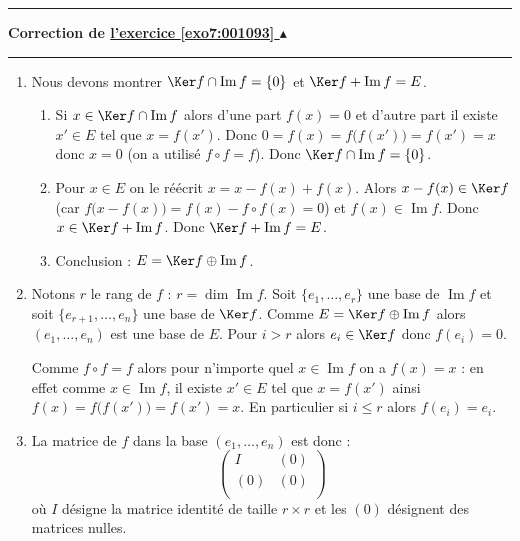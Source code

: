 \documentclass[11pt,a4paper]{article}
\renewcommand{\Im}{\mathop{\mathrm{Im}}\nolimits}
\renewcommand{\le}{\leqslant} \renewcommand{\leq}{\leqslant}
\newcounter{exo}
\newcommand{\correction}[1]{\hypertarget{cor7:#1}{}\label{cor7:#1}{\bf Correction de \hyperlink{exo7:#1}{l'exercice \ref{exo7:#1} $\blacktriangle$}}\vspace{1mm}\hrule\vspace{1mm}}
\newcommand{\fincorrection}{\vspace{1mm}\hrule\vspace*{7mm}}
\begin{document}
\fincorrection
\correction{001093}
\begin{enumerate}
  \item Nous devons montrer $\Ker f \cap \Im f = \{0\}$ et 
$\Ker f + \Im f = E$.
  \begin{enumerate}
     \item Si $x \in \Ker f \cap \Im f$ alors d'une part $f(x)=0$ et d'autre part il existe $x'\in E$ tel que 
$x=f(x')$. Donc $0=f(x)=f\big(f(x')\big)= f(x')=x$ donc $x=0$ (on a utilisé $f\circ f=f$). 
Donc $\Ker f \cap \Im f = \{0\}$.

     \item Pour $x\in E$ on le réécrit $x=x-f(x) + f(x)$. Alors $x-f(x) \in \Ker f$ 
(car $f\big(x-f(x) \big)=f(x)-f\circ f (x)=0$)
et $f(x)\in \Im f$. Donc $x \in \Ker f + \Im f$. Donc $\Ker f + \Im f = E$.

     \item Conclusion  : $E= \Ker f \oplus \Im f$.
  \end{enumerate}

  \item Notons $r$ le rang de $f$ : $r=\dim \Im f$.
Soit $\{e_1,\ldots,e_r\}$ une base de $\Im f$ et 
soit $\{e_{r+1},\ldots, e_n\}$ une base de $\Ker f$.
Comme 
$E= \Ker f \oplus \Im f$ alors
$(e_1,\ldots ,e_n)$ est une base de $E$.
Pour $i > r$ alors $e_i \in \Ker f$ donc $f(e_i)=0$.

Comme $f\circ f=f$ alors pour n'importe quel $x\in \Im f$ on a $f(x)=x$ :
en effet comme $x\in \Im f$, il existe $x'\in E$ tel que $x=f(x')$ 
ainsi $f(x)=f\big(f(x')\big)=f(x')=x$. En particulier si $i\le r$ alors
$f(e_i)=e_i$.

  \item La matrice de $f$ dans la base $(e_1,\ldots,e_n)$ est donc :
$$\begin{pmatrix}
  I & (0) \\
  (0) & (0) \\  
  \end{pmatrix}$$
où $I$ désigne la matrice identité de taille $r\times r$
et les $(0)$ désignent des matrices nulles.

\end{enumerate}
\end{document}
